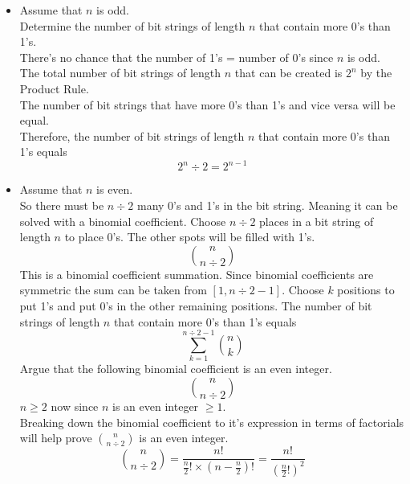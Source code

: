 \documentclass{article}
\begin{document}
\begin{enumerate}
\begin{itemize}
			\item
				Assume that $n$ is odd. \\
				Determine the number of bit strings of length $n$ that contain more 0's than 1's. \\
				There's no chance that the number of 1's = number of 0's since $n$ is odd. \\
				The total number of bit strings of length $n$ that can be created is $2^n$ by the Product Rule. \\
				The number of bit strings that have more 0’s than 1’s and vice versa will be equal. \\
				Therefore, the number of bit strings of length $n$ that contain more 0's than 1's equals\\
				\begin{equation*}
					2^n \div 2 = 2^{n - 1}
				\end{equation*}
			\item
				Assume that $n$ is even. \\
				So there must be $n \div 2$ many 0's and 1's in the bit string. Meaning it can be solved with a binomial coefficient. Choose $n \div 2$ places in a bit string of length $n$ to place 0's. The other spots will be filled with 1's. \\
				\begin{equation*}
					{n \choose n \div 2}
				\end{equation*}
				This is a binomial coefficient summation. Since binomial coefficients are symmetric the sum can be taken from $[1, n \div 2 - 1]$.
				Choose $k$ positions to put 1's and put 0's in the other remaining positions.
				The number of bit strings of length $n$ that contain more 0's than 1's equals
				\begin{equation*}
					\sum_{k = 1}^{n \div 2 - 1} {n \choose k}
				\end{equation*}
				Argue that the following binomial coefficient is an even integer.
				\begin{equation*}
					{n \choose n \div 2}
				\end{equation*}
				$n \geq 2$ now since $n$ is an even integer $\geq 1$. \\
				Breaking down the binomial coefficient to it's expression in terms of factorials will help prove ${n \choose n \div 2}$ is an even integer.
				\begin{equation*}
					{n \choose n \div 2} = \frac{n!} {\frac{n}{2}! \times (n - \frac{n}{2})!} = \frac{n!}{(\frac{n}{2}!)^2}
				\end{equation*}

\end{itemize}
\end{enumerate}
\end{document}
